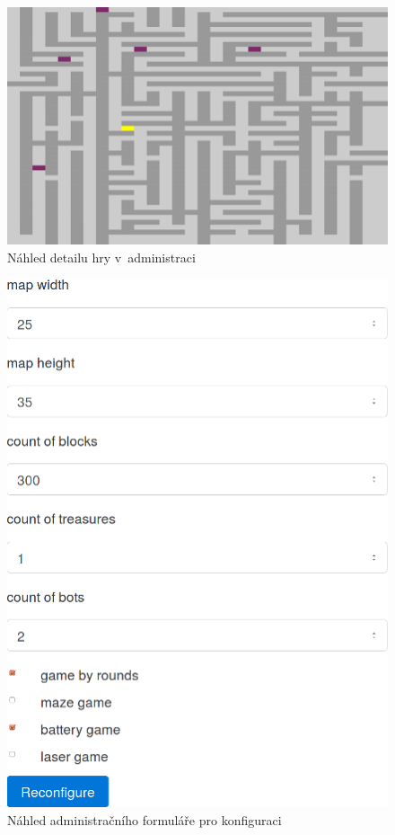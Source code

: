 \begin{figure}[H]
	\centering
	\includegraphics{assets/admin-game-detail}
	\caption{Náhled detailu hry v~administraci}
	\label{fig:admin-game-detail}
\end{figure}

\begin{figure}[H]
	\centering
	\includegraphics{assets/admin-conf-form}
	\caption{Náhled administračního formuláře pro konfiguraci}
	\label{fig:admin-conf-form}
\end{figure}
